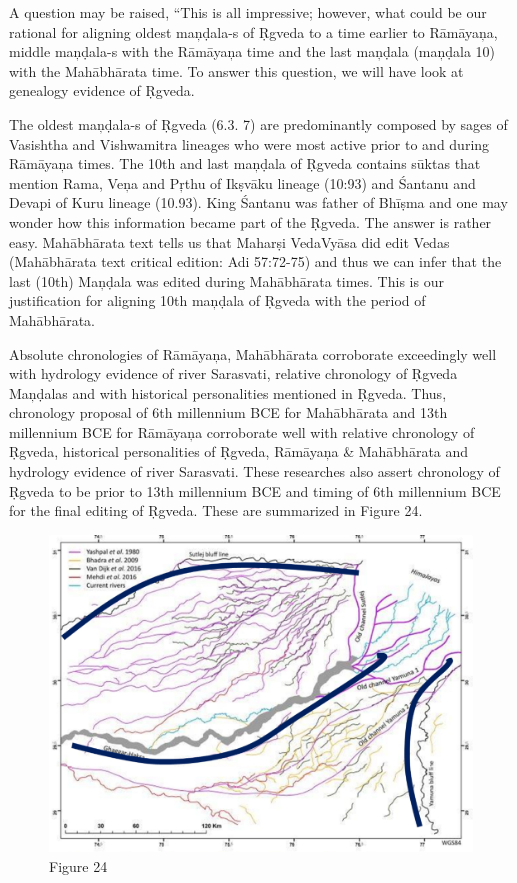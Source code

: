 A question may be raised, “This is all impressive; however, what could be our rational for aligning oldest maņḍala-s of Ṛgveda to a time earlier to Rāmāyaņa, middle maņḍala-s with the Rāmāyaņa time and the last maņḍala (maņḍala 10) with the Mahābhārata time. To answer this question, we will have look at genealogy evidence of Ṛgveda.

The oldest maņḍala-s of Ṛgveda (6.3. 7) are predominantly composed by sages of Vasishtha and Vishwamitra lineages who were most active prior to and during Rāmāyaņa times. The 10th and last maņḍala of Ṛgveda contains sūktas that mention Rama, Veņa and Pŗthu of Ikṣvāku lineage (10:93) and Śantanu and Devapi of Kuru lineage (10.93). King Śantanu was father of Bhīṣma and one may wonder how this information became part of the Ṛgveda. The answer is rather easy. Mahābhārata text tells us that Maharṣi VedaVyāsa did edit Vedas (Mahābhārata text critical edition: Adi 57:72-75) and thus we can infer that the last (10th) Maņḍala was edited during Mahābhārata times. This is our justification for aligning 10th maņḍala of Ṛgveda with the period of Mahābhārata.

Absolute chronologies of Rāmāyaņa, Mahābhārata corroborate exceedingly well with hydrology evidence of river Sarasvati, relative chronology of Ṛgveda Maņḍalas and with historical personalities mentioned in Ṛgveda. Thus, chronology proposal of 6th millennium BCE for Mahābhārata and 13th millennium BCE for Rāmāyaņa corroborate well with relative chronology of Ṛgveda, historical personalities of Ṛgveda, Rāmāyaņa \& Mahābhārata and hydrology evidence of river Sarasvati. These researches also assert chronology of Ṛgveda to be prior to 13th millennium BCE and timing of 6th millennium BCE for the final editing of Ṛgveda. These are summarized in Figure 24.

\begin{figure}
\includegraphics{"images/8-24.jpg"}
\caption{Figure 24}
\end{figure}




